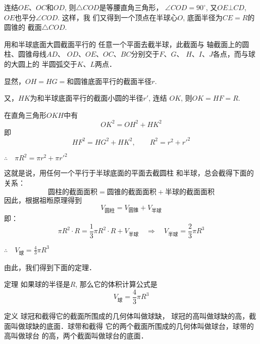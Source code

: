 连结$OE$、$OC$和$OD$, 则$\triangle COD$是等腰直角三角形，
$\angle COD=90^{\circ}$, 又$OE\bot CD$, $OE$也平分$\angle COD$. 这样，我
们又得到一个顶点在半球心$O$, 底面半径为$CE=R$的圆锥的
截面$\triangle COD$.

用和半球底面大圆截面平行的
任意一个平面去截半球，此截面与
轴截面上的圆柱、圆锥母线$AD$、
$OD$、$OE$、$OC$、$BC$分别交于$F$、$G$、
$H$、$I$、$J$各点，而与球的大圆上的
半圆弧交于$K$、$L$两点．

显然，$OH=HG=$和圆锥底面平行的截面半径$r$. 

又，$HK$为和半球底面平行的截面小圆的半径$r'$, 连结
$OK$, 则$OK=HF=R$.

在直角三角形$OKH$中有
\[OK^2=OH^2+HK^2\]
即
\[HF^2=HG^2+HK^2,\qquad R^2=r^2+{r'}^2\]

$\therefore\quad \pi R^2=\pi r^2+\pi {r'}^2$

这就是说，用任何一个平行于半球底面的平面去截圆柱
和半球，总会截得下面的关系：
\[\text{圆柱的截面面积}=\text{圆锥的截面面积}+\text{半球的截面面积}\]
因此，根据祖暅原理得到
\[V_{\text{圆柱}}=V_{\text{圆锥}}+V_{\text{半球}}\]
即：
\[\pi R^2\cdot R=\frac{1}{3}\pi R^2\cdot R+V_{\text{半球}}\quad \Rightarrow\quad V_{\text{半球}}=\frac{2}{3}\pi R^3\]

$\therefore\quad V_{\text{球}}=\frac{4}{3}\pi R^3$

由此，我们得到下面的定理．

\begin{blk}
   {定理} 如果球的半径是$R$, 那么它的体积计算公式是
\[V_{\text{球}}=\frac{4}{3}\pi R^3\]
\end{blk}

\begin{blk}
    {定义} 球冠和截得它的截面所围成的几何体叫做球缺，
球冠的高叫做球缺的高，截面叫做球缺的底面．球带和截得
它的两个截面所围成的几何体叫做球台，球带的高叫做球台
的高，两个截面叫做球台的底面．
\end{blk}

